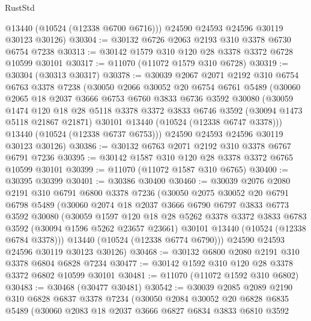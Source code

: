 \begin{lexlean}{RustStd}
\begin{coremodule}
        @13440
        (@10524 (@12338 @6700 @6716)))
      @24590
      @24593
      @24596
      @30119
      @30123
      @30126)
@30304 := @30132 @6726 @2063 @2193 @310 @3378 @6730 @6754 @7238
@30313 := @30142 @1579 @310 @120 @28 @3378 @3372 @6728 @10599 @30101
@30317 := @11070 (@11072 @1579 @310 @6728)
@30319 := @30304 (@30313 @30317)
@30378 := @30039
    @2067
    @2071
    @2192
    @310
    @6754
    @6763
    @3378
    @7238
    (@30050
      @2066
      @30052
      @20
      @6754
      @6761
      @5489
      (@30060
        @2065
        @18
        @2037
        @3666
        @6753
        @6760
        @3833
        @6736
        @3592
        @30080
        (@30059
          @1474
          @120
          @18
          @28
          @5118
          @3378
          @3372
          @3833
          @6746
          @3592
          (@30094 @1473 @5118 @21867 @21871)
          @30101
          @13440
          (@10524 (@12338 @6747 @3378)))
        @13440
        (@10524 (@12338 @6737 @6753)))
      @24590
      @24593
      @24596
      @30119
      @30123
      @30126)
@30386 := @30132 @6763 @2071 @2192 @310 @3378 @6767 @6791 @7236
@30395 := @30142 @1587 @310 @120 @28 @3378 @3372 @6765 @10599 @30101
@30399 := @11070 (@11072 @1587 @310 @6765)
@30400 := @30395 @30399
@30401 := @30386 @30400
@30460 := @30039
    @2076
    @2080
    @2191
    @310
    @6791
    @6800
    @3378
    @7236
    (@30050
      @2075
      @30052
      @20
      @6791
      @6798
      @5489
      (@30060
        @2074
        @18
        @2037
        @3666
        @6790
        @6797
        @3833
        @6773
        @3592
        @30080
        (@30059
          @1597
          @120
          @18
          @28
          @5262
          @3378
          @3372
          @3833
          @6783
          @3592
          (@30094 @1596 @5262 @23657 @23661)
          @30101
          @13440
          (@10524 (@12338 @6784 @3378)))
        @13440
        (@10524 (@12338 @6774 @6790)))
      @24590
      @24593
      @24596
      @30119
      @30123
      @30126)
@30468 := @30132 @6800 @2080 @2191 @310 @3378 @6804 @6828 @7234
@30477 := @30142 @1592 @310 @120 @28 @3378 @3372 @6802 @10599 @30101
@30481 := @11070 (@11072 @1592 @310 @6802)
@30483 := @30468 (@30477 @30481)
@30542 := @30039
    @2085
    @2089
    @2190
    @310
    @6828
    @6837
    @3378
    @7234
    (@30050
      @2084
      @30052
      @20
      @6828
      @6835
      @5489
      (@30060
        @2083
        @18
        @2037
        @3666
        @6827
        @6834
        @3833
        @6810
        @3592

\end{coremodule}
\end{lexlean}
